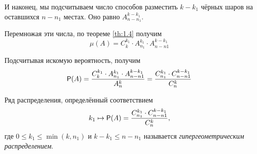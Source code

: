 И наконец, мы подсчитываем число способов разместить $k - k_1$ чёрных шаров на оставшихся $n - n_1$ местах. Оно равно $A_{n-n_1}^{k-k_1}$.

Перемножая эти числа, по теореме \ref{th:1.4} получим
\begin{equation*}
	\mu(A) = C_{k}^{k_1}\cdot A_{n_1}^{k_1}\cdot A_{n-n1}^{k-k_1}
\end{equation*}

Подсчитывая искомую вероятность, получим
\begin{equation*}
	\P(A)=\frac{C_{k}^{k_1}\cdot A_{n_1}^{k_1}\cdot A_{n-n1}^{k-k_1}}{A_n^k}=\frac{C_{n_1}^{k_1}\cdot C_{n-n1}^{k-k_1}}{C_n^k}
\end{equation*}

\begin{definition}
\label{def:10.2}
Ряд распределения, определённый соответствием
\begin{equation*}
	k_1 \mapsto \P(A) = \frac{C_{n_1}^{k_1}\cdot C_{n-n1}^{k-k_1}}{C_n^k},
\end{equation*}
где $0 \leq k_1 \leq \min(k, n_1 )$ и $k - k_1 \leq n - n_1$ называется \textit{гипергеометрическим распределением}.
\end{definition}
